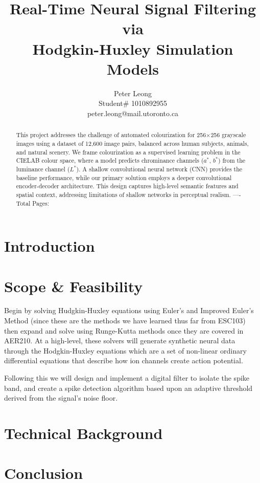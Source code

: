\documentclass{article} %
\title{Real-Time Neural Signal Filtering via \\
Hodgkin-Huxley Simulation Models}
\author{
    Peter Leong \\
    Student\# 1010892955 \\
    peter.leong@mail.utoronto.ca \\
\AND
}
\begin{document}
\maketitle

\vspace{-6ex}

\begin{abstract}
This project addresses the challenge of automated colourization for 256$\times$256 grayscale images using a dataset of 12,600 image pairs, balanced across human subjects, 
animals, and natural scenery. We frame colourization as a supervised learning problem in the CIELAB colour space, where a model predicts chrominance channels ($a^*$, $b^*$) 
from the luminance channel ($L^*$). A shallow convolutional neural network (CNN) provides the baseline performance, while our primary solution employs a deeper convolutional 
encoder-decoder architecture. This design captures high-level semantic features and spatial context, addressing limitations of shallow networks in perceptual realism.
----Total Pages: \pageref{last_page}
\end{abstract}

\vspace{2ex}

\begin{multicols}{2}

\section{Introduction}

\section{Scope \& Feasibility}

Begin by solving Hudgkin-Huxley equations using Euler's and Improved Euler's Method (since these are the methods we have learned thus far from ESC103)
then expand and solve using Runge-Kutta methods once they are covered in AER210. At a high-level, these solvers will generate synthetic neural data through
the Hodgkin-Huxley equations which are a set of non-linear ordinary differential equations that describe how ion channels create action potential.

Following this we will design and implement a digital filter to isolate the spike band, and create a spike detection algorithm based upon an adaptive threshold
derived from the signal's noise floor.

\section{Technical Background}

\section{Conclusion}

\label{last_page}

\newpage



\end{multicols}
\end{document}
